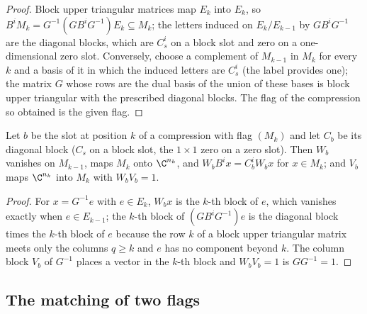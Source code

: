 \begin{proof}
    \leanok
    Block upper triangular matrices map $E_k$ into $E_k$, so $B^iM_k=G^{-1}(GB^iG^{-1})E_k\subseteq M_k$;
    the letters induced on $E_k/E_{k-1}$ by $GB^iG^{-1}$ are the diagonal blocks, which are $C_s^i$
    on a block slot and zero on a one-dimensional zero slot. Conversely, choose a complement of
    $M_{k-1}$ in $M_k$ for every $k$ and a basis of it in which the induced letters are $C_s^i$
    (the label provides one); the matrix $G$ whose rows are the dual basis of the union of these
    bases is block upper triangular with the prescribed diagonal blocks. The flag of the
    compression so obtained is the given flag.
\end{proof}

\begin{lemma}
    \label{lem:asym_uniq_maps}
    \leanok
    Let $b$ be the slot at position $k$ of a compression with flag $(M_k)$ and let $C_b$ be its
    diagonal block ($C_s$ on a block slot, the $1\times1$ zero on a zero slot). Then $W_b$ vanishes
    on $M_{k-1}$, maps $M_k$ onto $\C^{n_k}$, and $W_bB^ix=C_b^iW_bx$ for $x\in M_k$; and $V_b$ maps
    $\C^{n_k}$ into $M_k$ with $W_bV_b=1$.
\end{lemma}

\begin{proof}
    \leanok
    For $x=G^{-1}e$ with $e\in E_k$, $W_bx$ is the $k$-th block of $e$, which vanishes exactly when
    $e\in E_{k-1}$; the $k$-th block of $(GB^iG^{-1})e$ is the diagonal block times the $k$-th block
    of $e$ because the row $k$ of a block upper triangular matrix meets only the columns $q\geq k$
    and $e$ has no component beyond $k$. The column block $V_b$ of $G^{-1}$ places a vector in the
    $k$-th block and $W_bV_b=1$ is $GG^{-1}=1$.
\end{proof}

\subsection{The matching of two flags}

